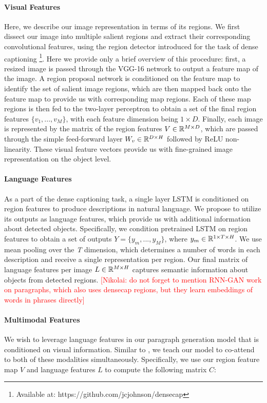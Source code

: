 \documentclass[11pt,a4paper]{article}
\newcommand{\kibitz}[2]{\ifnum\Comments=1\textcolor{#1}{#2}\fi}
\newcommand{\nikolai}[1]{\kibitz{red}      {[Nikolai: #1]}}
\newcommand{\R}{\mathbb{R}}
\begin{document}
\paragraph{Visual Features} Here, we describe our image representation in terms of its regions.
We first dissect our image into multiple salient regions and extract their corresponding convolutional features, using the region detector introduced for the task of dense captioning \cite{densecap}\footnote{Available at: https://github.com/jcjohnson/densecap}.
Here we provide only a brief overview of this 
procedure: first, a resized image is passed through the VGG-16 network \cite{Simonyan2014} to output a feature map of the image.
A region proposal network is conditioned on the feature map to identify the set of salient image regions, which are then mapped back onto the feature map to provide us with corresponding map regions.
Each of these map regions is then fed to the two-layer perceptron to obtain a set of the final region features ${\{v_1, ..., v_M\}}$, with each feature dimension being ${1 \times D}$.
Finally, each image is represented by the matrix of the region features $V \in \R\sp{M \times D}$, which are passed through the simple feed-forward layer $W_v \in \R\sp{D \times H}$ followed by ReLU non-linearity.
These visual feature vectors provide us with fine-grained image representation on the object level.

\paragraph{Language Features} As a part of the dense captioning task, a single layer LSTM \cite{lstm97} is conditioned on region features to produce descriptions in natural language.
We propose to utilize its outputs as language features, which provide us with additional information about detected objects.
Specifically, we condition pretrained LSTM on region features to obtain a set of outputs ${Y = \{y_m, ..., y_M\}}$, where $y_m \in \R\sp{1 \times T \times H}$.
We use mean pooling over the \textit{T} dimension, which determines a number of words in each description and receive a single representation per region.
Our final matrix of language features per image $L \in \R\sp{M \times H}$ captures semantic information about objects from detected regions.
\nikolai{do not forget to mention RNN-GAN work on paragraphs, which also uses densecap regions, but they learn embeddings of words in phrases directly}

\paragraph{Multimodal Features} We wish to leverage language features in our paragraph generation model that is conditioned on visual information.
Similar to \cite{vqaLU16}, we teach our model to co-attend to both of these modalities simultaneously.
Specifically, we use our region feature map $V$ and language features $L$ to compute the following matrix $C$:
\end{document}
